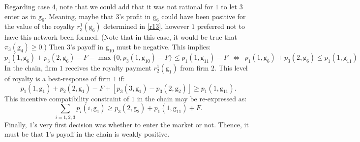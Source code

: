 \documentclass{article}
\begin{document}
Regarding case 4, note that we could add that it was not rational for $1$ to let $3$ enter as in $\text{g}_6$. Meaning, maybe that $3$'s profit in $\text{g}_6$ could have been positive for the value of the royalty $r^1_3(\text{g}_6)$ determined in \eqref{r13}, however $1$ preferred not to have this network been formed. (Note that in this case, it would be true that $\pi_3(\text{g}_4)\geq 0$.) Then $3$'s payoff in $\text{g}_{10}$ must be negative. This implies:
\begin{equation*}
    p_1(1,\text{g}_6)+p_3(2,\text{g}_6)-F - \max\{0, p_3(1,\text{g}_{10})-F\}\leq p_1(1,\text{g}_{11})-F~~\Longleftrightarrow~~p_1(1,\text{g}_6)+p_3(2,\text{g}_6)\leq p_1(1,\text{g}_{11})
\end{equation*}
In the chain, firm $1$ receives the royalty payment $r^1_2(\text{g}_1)$ from firm $2$. This level of royalty is a best-response of firm $1$ if: 
\begin{equation*}
  p_1(1,\text{g}_1)+ p_2(2,\text{g}_1)-F+[ p_3(3,\text{g}_1)-p_3(2,\text{g}_2)]\geq p_1(1,\text{g}_{11}).  
\end{equation*}
This incentive compatibility constraint of $1$ in the chain may be re-expressed as: 
\begin{equation}
    \sum_{i=1,2,3} p_i(i,\text{g}_1) \geq p_3(2,\text{g}_2)+p_1(1,\text{g}_{11})+F. 
\end{equation}
\indent Finally, $1$'s very first decision was whether to enter the market or not. Thence, it must be that $1$'s payoff in the chain is weakly positive. 













\end{document}

